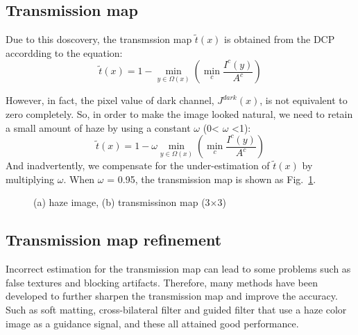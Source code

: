 \documentclass[10pt,twocolumn,letterpaper]{article}
\begin{document}
\subsection{Transmission map}
\par Due to this doscovery, the transmssion map $\tilde{t}(x) $ is obtained from the DCP accordding to the equation:
\begin{equation}
\tilde{t}(x)=1-\min\limits_{y\in\Omega(x)}(\min\limits_{c}\frac{I^{c}(y)}{A^c})
\end{equation}
\par However, in fact, the pixel value of dark channel, $J^{dark}(x)$, is not equivalent to zero completely. So, in order to make the image looked natural, we need to retain a small amount of haze by using a constant $\omega$ (0< $\omega$ <1):\begin{equation}
\tilde{t}(x)=1-\omega \min\limits_{y\in\Omega(x)}(\min\limits_{c}\frac{I^{c}(y)}{A^c})
\end{equation}
And inadvertently, we compensate for the under-estimation of $\tilde{t}(x)$ by multiplying $\omega$. When $\omega$ = 0.95, the transmission map is shown as Fig.~\ref{trans}.
\begin{figure}[htp]
 \centering{}
 \hfill
{}
 \caption{(a) haze image, (b) transmissinon map (3$\times$3)}
\label{trans}
\end{figure} 
\subsection{Transmission map refinement}
\par Incorrect estimation for the transmission map can lead to some problems such as false textures and blocking artifacts. Therefore, many methods have been developed to further sharpen the transmission map and improve the accuracy. Such as soft matting, cross-bilateral filter and guided filter that use a haze color image as a guidance signal, and these all attained good performance.
\end{document}
